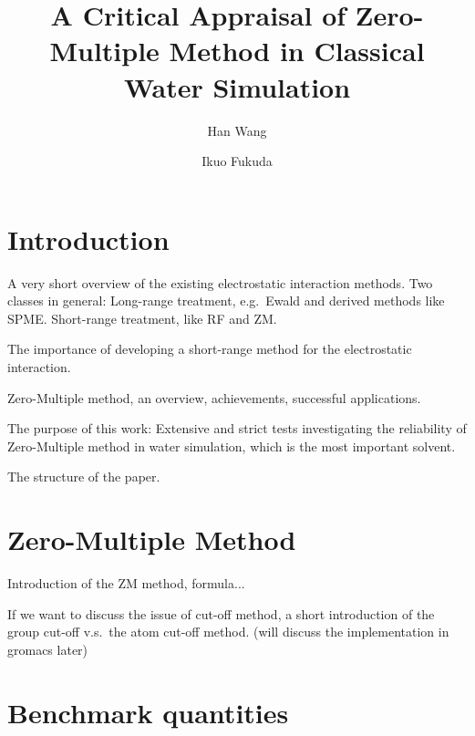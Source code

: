 \documentclass[aip,jcp,a4paper,preprint,unsortedaddress,onecolumn,fleqn]{revtex4-1}
\newcommand{\recheck}[1]{{\color{red} #1}}
\begin{document}
\title{A Critical Appraisal of Zero-Multiple Method in Classical Water Simulation}
\author{Han Wang}
\author{Ikuo Fukuda}

\begin{abstract}
\end{abstract}

\maketitle

\section{Introduction}

A very short overview of the existing electrostatic interaction methods. Two classes in general:
Long-range treatment, e.g.~Ewald and derived methods like SPME.
Short-range treatment, like RF and ZM.

The importance of developing a short-range method for the electrostatic interaction.

Zero-Multiple method, an overview, achievements, successful applications.

The purpose of this work: Extensive and strict tests investigating the reliability of Zero-Multiple method in water simulation, which is the most important solvent.

The structure of the paper.

\section{Zero-Multiple Method}

Introduction of the ZM method, formula...

\recheck{If we want to discuss the issue of cut-off method, a short
  introduction of the group cut-off v.s.~the atom cut-off
  method. (will discuss the implementation in gromacs later)}



\section{Benchmark quantities}
\end{document}
